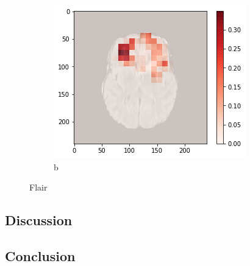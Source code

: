 \begin{figure}[H]
        \begin{subfigure}{.33\textwidth}
        \centering
        \includegraphics[width=\linewidth]{chapters/07_brats3d/images/12_flair_hdm.png}
        \caption{b}
    \end{subfigure}
    \caption{Flair}
\end{figure}

\subsection{Discussion}


\subsection{Conclusion}

